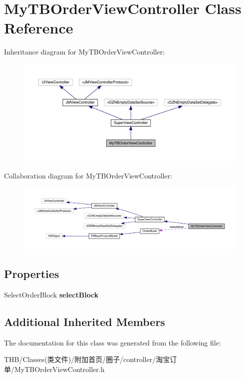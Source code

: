 \hypertarget{interface_my_t_b_order_view_controller}{}\section{My\+T\+B\+Order\+View\+Controller Class Reference}
\label{interface_my_t_b_order_view_controller}


Inheritance diagram for My\+T\+B\+Order\+View\+Controller\+:\nopagebreak
\begin{figure}[H]
\begin{center}
\leavevmode
\includegraphics[width=350pt]{interface_my_t_b_order_view_controller__inherit__graph}
\end{center}
\end{figure}


Collaboration diagram for My\+T\+B\+Order\+View\+Controller\+:\nopagebreak
\begin{figure}[H]
\begin{center}
\leavevmode
\includegraphics[width=350pt]{interface_my_t_b_order_view_controller__coll__graph}
\end{center}
\end{figure}
\subsection*{Properties}
\begin{DoxyCompactItemize}
\item 
\mbox{\label{interface_my_t_b_order_view_controller_ac427da0dbf3a5aaa04e71fcc66325073}} 
Select\+Order\+Block {\bfseries select\+Block}
\end{DoxyCompactItemize}
\subsection*{Additional Inherited Members}


The documentation for this class was generated from the following file\+:\begin{DoxyCompactItemize}
\item 
T\+H\+B/\+Classes(类文件)/附加首页/圈子/controller/淘宝订单/My\+T\+B\+Order\+View\+Controller.\+h\end{DoxyCompactItemize}
